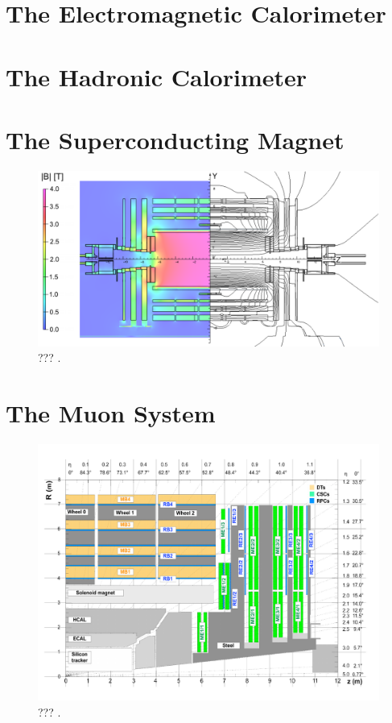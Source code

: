   \section{The Electromagnetic Calorimeter}

  \section{The Hadronic Calorimeter}

  \section{The Superconducting Magnet}

    \begin{figure}[h!]
      \centering
      \includegraphics[width=\textwidth]{img/I-3-cms/magnet.png}
      \caption{??? \cite{Chatrchyan:2009si}.}
      \label{fig:I-3-cms-magnet}
    \end{figure}

  \section{The Muon System}

    \begin{figure}[h!]
      \centering
      \includegraphics[width=\textwidth]{img/I-3-cms/quadrant-postls1.pdf}
      \caption{??? \cite{1748-0221-3-08-S08004}.}
      \label{fig:I-3-cms-quadrant}
    \end{figure}

